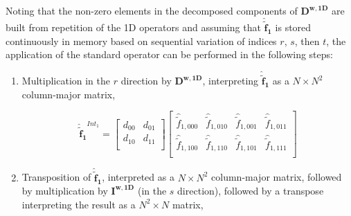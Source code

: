 \documentclass[12pt,Bold,letterpaper,TexShade]{mcgilletdclass}
\numberwithin{equation}{section}
\newcommand{\mat}[1]{\bm{{#1}}}
\newcommand{\vect}[1]{\bm{{#1}}}
\begin{document}
Noting that the non-zero elements in the decomposed components of $\mat{D^{w,1D}}$ are built from repetition of the 1D operators and assuming that $\vect{\hat{\tilde{f}}_{1}}$ is stored continuously in memory based on sequential variation of indices $r$, $s$, then $t$, the application of the standard operator can be performed in the following steps:

\begin{enumerate}
\item Multiplication in the $r$ direction by $\mat{D^{w,1D}}$, interpreting $\vect{\hat{\tilde{f}}_{1}}$ as a $N \times N^2$ column-major matrix,

\begin{equation} \nonumber
\vect{\hat{\tilde{f}}_{1}}^{Int_1}
=
\begin{bmatrix}
d_{00} & d_{01} \\
d_{10} & d_{11} \\
\end{bmatrix}
\begin{bmatrix}
\hat{\tilde{f}}_{1,000} & \hat{\tilde{f}}_{1,010} & \hat{\tilde{f}}_{1,001} & \hat{\tilde{f}}_{1,011} \\
\hat{\tilde{f}}_{1,100} & \hat{\tilde{f}}_{1,110} & \hat{\tilde{f}}_{1,101} & \hat{\tilde{f}}_{1,111} \\
\end{bmatrix}
\end{equation}

\item Transposition of $\vect{\hat{\tilde{f}}_{1}}$, interpreted as a $N \times N^2$ column-major matrix, followed by multiplication by $\mat{I^{w,1D}}$ (in the $s$ direction), followed by a transpose interpreting the result as a $N^2 \times N$ matrix,


\end{enumerate}
\end{document}
